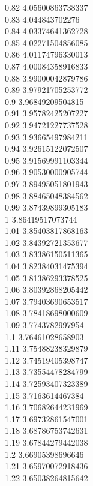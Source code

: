 {0.82	4.05600863738337\\
0.83	4.044843702276\\
0.84	4.03374641362728\\
0.85	4.02271504856085\\
0.86	4.01174796330013\\
0.87	4.00084358916833\\
0.88	3.99000042879786\\
0.89	3.97921705253772\\
0.9	3.96849209504815\\
0.91	3.95782425207227\\
0.92	3.94721227737528\\
0.93	3.93665497984211\\
0.94	3.92615122072507\\
0.95	3.91569991103344\\
0.96	3.90530000905744\\
0.97	3.89495051801943\\
0.98	3.88465048384562\\
0.99	3.87439899305183\\
1	3.86419517073744\\
1.01	3.85403817868163\\
1.02	3.84392721353677\\
1.03	3.83386150511365\\
1.04	3.82384031475394\\
1.05	3.81386293378525\\
1.06	3.80392868205442\\
1.07	3.79403690653517\\
1.08	3.78418698000609\\
1.09	3.7743782997954\\
1.1	3.76461028658903\\
1.11	3.75488238329879\\
1.12	3.74519405398747\\
1.13	3.73554478284799\\
1.14	3.72593407323389\\
1.15	3.7163614467384\\
1.16	3.70682644231969\\
1.17	3.69732861547001\\
1.18	3.68786753742631\\
1.19	3.67844279442038\\
1.2	3.66905398696646\\
1.21	3.65970072918436\\
1.22	3.65038264815642\\
}
